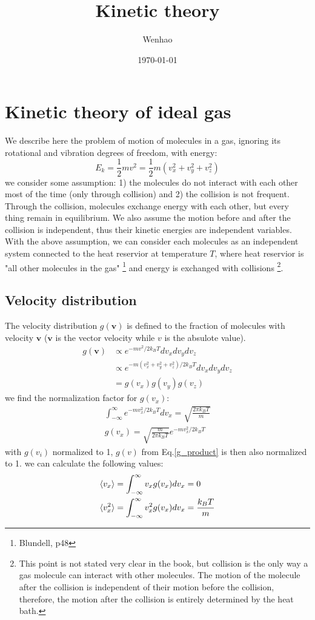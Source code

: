 \documentclass{article}
\begin{document}
\title{Kinetic theory}
\author{Wenhao}
\date{\today}
\maketitle

\section{Kinetic theory of ideal gas}
We describe here the problem of motion of molecules in a gas, 
ignoring its rotational and vibration degrees of freedom, with 
energy: 
\begin{equation}
    E_k = \frac{1}{2}mv^2 = \frac{1}{2}m(v_x^2 + v_y^2 + v_z^2)
\end{equation}
we consider some assumption: 1) the molecules do not interact 
with each other most of the time (only through collision) and 2) the collision is 
not frequent. Through the collision, molecules exchange energy with each other,
but every thing remain in equilibrium. We also assume the motion before and 
after the collision is independent, thus their kinetic energies are 
independent variables. With the above assumption, we can consider 
each molecules as an independent system connected to the heat reservior at 
temperature $T$, where heat reservior is "all other molecules in the gas"
\footnote{Blundell, p48} and energy is exchanged with collisions
\footnote{This point
is not stated very clear in the book, but collision is the only way a gas molecule
can interact with other molecules. The motion of the molecule after the collision is
independent of their motion before the collision, therefore, the motion after the 
collision is entirely determined by the heat bath.}.

\subsection*{Velocity distribution}
The velocity distribution $g(\mathbf{v})$ is defined to the fraction of molecules with 
velocity $\mathbf{v}$ 
($\mathbf{v}$ is the vector velocity while $v$ is the absulote value). 
\begin{align}
    g(\mathbf{v}) &\propto e^{-mv^2/2k_BT} dv_xdv_ydv_z \\
    &\propto e^{-m(v_x^2 + v_y^2 + v_z^2)/2k_BT} dv_xdv_ydv_z \\
    &= g(v_x)g(v_y)g(v_z) \label{g_product}
\end{align} 
we find the normalization factor for $g(v_x)$:
\begin{gather}
    \int_{-\infty}^{\infty} e^{-mv_x^2/2k_BT} dv_x = \sqrt{\frac{2\pi k_BT}{m}} \\
    g(v_x) = \sqrt{\frac{m}{2\pi k_BT}} e^{-mv_x^2/2k_BT}
\end{gather}
with $g(v_i)$ normalized to 1, $g(v)$ from Eq.\ref{g_product} is then also normalized to 1.
we can calculate the following values:
\begin{align}
    \langle v_x \rangle &= \int_{-\infty}^{\infty} v_x g(v_x) dv_x = 0 \notag \\
    \langle v_x^2 \rangle &= \int_{-\infty}^{\infty} v_x^2 g(v_x) dv_x = \frac{k_BT}{m} \notag 
\end{align}
\end{document}
